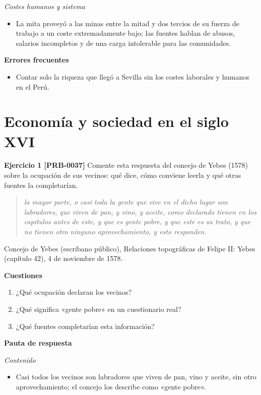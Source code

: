 \documentclass{book}
\begin{document}
\noindent\textit{Costes humanos y sistema}
\begin{itemize}
\item La mita proveyó a las minas entre la mitad y dos tercios de su fuerza de trabajo a un coste extremadamente bajo; las fuentes hablan de abusos, salarios incompletos y de una carga intolerable para las comunidades.
\end{itemize}

\noindent\textbf{Errores frecuentes}
\begin{itemize}
\item Contar solo la riqueza que llegó a Sevilla sin los costes laborales y humanos en el Perú.
\end{itemize}

\section{Economía y sociedad en el siglo XVI}

\noindent\textbf{Ejercicio 1 [PRB-0037]}
Comente esta respuesta del concejo de Yebes (1578) sobre la ocupación de sus vecinos: qué dice, cómo conviene leerla y qué otras fuentes la completarían.


\begin{quote}
\itshape la mayor parte, o casi toda la gente que vive en el dicho lugar son labradores, que viven de pan, y vino, y aceite, como declarado tienen en los capitulos antes de este, y que es gente pobre, y que este es su trato, y que no tienen otro ninguno aprovechamiento, y esto responden.
\end{quote}
{\noindent\footnotesize Concejo de Yebes (escribano público), Relaciones topográficas de Felipe II: Yebes (capítulo 42), 4 de noviembre de 1578.\par}

\noindent\textbf{Cuestiones}
\begin{enumerate}
\item ¿Qué ocupación declaran los vecinos?
\item ¿Qué significa «gente pobre» en un cuestionario real?
\item ¿Qué fuentes completarían esta información?
\end{enumerate}

\noindent\textbf{Pauta de respuesta}

\noindent\textit{Contenido}
\begin{itemize}
\item Casi todos los vecinos son labradores que viven de pan, vino y aceite, sin otro aprovechamiento; el concejo los describe como «gente pobre».
\end{itemize}
\end{document}

